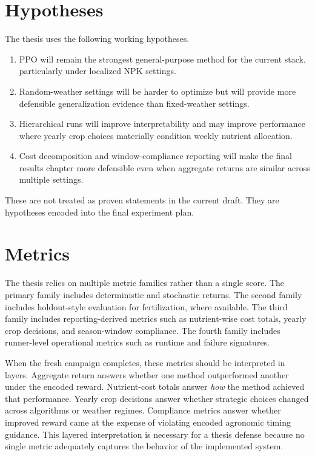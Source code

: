 \section{Hypotheses}

The thesis uses the following working hypotheses.
\begin{enumerate}[leftmargin=1.2cm]
    \item PPO will remain the strongest general-purpose method for the current stack, particularly under localized NPK settings.
    \item Random-weather settings will be harder to optimize but will provide more defensible generalization evidence than fixed-weather settings.
    \item Hierarchical runs will improve interpretability and may improve performance where yearly crop choices materially condition weekly nutrient allocation.
    \item Cost decomposition and window-compliance reporting will make the final results chapter more defensible even when aggregate returns are similar across multiple settings.
\end{enumerate}

These are not treated as proven statements in the current draft. They are hypotheses encoded into the final experiment plan.

\section{Metrics}

The thesis relies on multiple metric families rather than a single score. The primary family includes deterministic and stochastic returns. The second family includes holdout-style evaluation for fertilization, where available. The third family includes reporting-derived metrics such as nutrient-wise cost totals, yearly crop decisions, and season-window compliance. The fourth family includes runner-level operational metrics such as runtime and failure signatures.

When the fresh campaign completes, these metrics should be interpreted in layers. Aggregate return answers whether one method outperformed another under the encoded reward. Nutrient-cost totals answer \emph{how} the method achieved that performance. Yearly crop decisions answer whether strategic choices changed across algorithms or weather regimes. Compliance metrics answer whether improved reward came at the expense of violating encoded agronomic timing guidance. This layered interpretation is necessary for a thesis defense because no single metric adequately captures the behavior of the implemented system.

